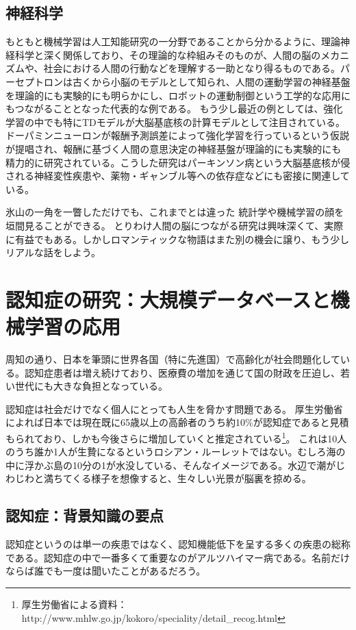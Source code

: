 \subsection{神経科学}
もともと機械学習は人工知能研究の一分野であることから分かるように、理論神経科学と深く関係しており、その理論的な枠組みそのものが、人間の脳のメカニズムや、社会における人間の行動などを理解する一助となり得るものである。パーセプトロンは古くから小脳のモデルとして知られ、人間の運動学習の神経基盤を理論的にも実験的にも明らかにし、ロボットの運動制御という工学的な応用にもつながることとなった代表的な例である。
もう少し最近の例としては、強化学習の中でも特にTDモデルが大脳基底核の計算モデルとして注目されている。ドーパミンニューロンが報酬予測誤差によって強化学習を行っているという仮説が提唱され、報酬に基づく人間の意思決定の神経基盤が理論的にも実験的にも精力的に研究されている。こうした研究はパーキンソン病という大脳基底核が侵される神経変性疾患や、薬物・ギャンブル等への依存症などにも密接に関連している。

氷山の一角を一瞥しただけでも、これまでとは違った
統計学や機械学習の顔を垣間見ることができる。
とりわけ人間の脳につながる研究は興味深くて、実際に有益でもある。しかしロマンティックな物語はまた別の機会に譲り、もう少しリアルな話をしよう。

\section{認知症の研究：大規模データベースと機械学習の応用}
周知の通り、日本を筆頭に世界各国（特に先進国）で高齢化が社会問題化している。認知症患者は増え続けており、医療費の増加を通じて国の財政を圧迫し、若い世代にも大きな負担となっている。

認知症は社会だけでなく個人にとっても人生を脅かす問題である。
厚生労働省によれば日本では現在既に65歳以上の高齢者のうち約10\%が認知症であると見積もられており、しかも今後さらに増加していくと推定されている\footnote{厚生労働省による資料：http://www.mhlw.go.jp/kokoro/speciality/detail\_recog.html
}。
これは10人のうち誰か1人が生贄になるというロシアン・ルーレットではない。むしろ海の中に浮かぶ島の10分の1が水没している、そんなイメージである。水辺で潮がじわじわと満ちてくる様子を想像すると、生々しい光景が脳裏を掠める。

\subsection{認知症：背景知識の要点}
認知症というのは単一の疾患ではなく、認知機能低下を呈する多くの疾患の総称である。認知症の中で一番多くて重要なのがアルツハイマー病である。名前だけならば誰でも一度は聞いたことがあるだろう。

